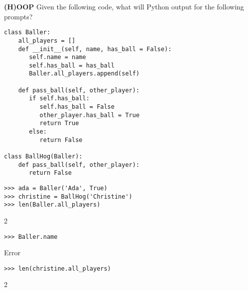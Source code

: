 \begin{blocksection}
\question \textbf{(H)OOP} \newline
Given the following code, what will Python output for the following prompts?

\begin{lstlisting}
class Baller:
    all_players = []
    def __init__(self, name, has_ball = False):
       self.name = name
       self.has_ball = has_ball
       Baller.all_players.append(self)

    def pass_ball(self, other_player):
       if self.has_ball:
          self.has_ball = False
          other_player.has_ball = True
          return True
       else:
          return False

class BallHog(Baller):
    def pass_ball(self, other_player):
       return False

\end{lstlisting}
\end{blocksection}
\newline
\newline
\newline
\begin{blocksection}

\begin{lstlisting}
>>> ada = Baller('Ada', True)
>>> christine = BallHog('Christine')
>>> len(Baller.all_players)
\end{lstlisting}
\begin{solution}[.2in]
2
\end{solution}

\begin{lstlisting}
>>> Baller.name
\end{lstlisting}
\begin{solution}[.2in]
Error
\end{solution}

\begin{lstlisting}
>>> len(christine.all_players)
\end{lstlisting}
\begin{solution}[.2in]
2
\end{solution}
\end{blocksection}

